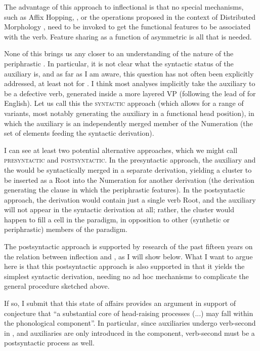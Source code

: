 \documentclass[output=paper]{LSP/langsci}
\begin{document}
The advantage of this approach to inflectional  is that no special mechanisms, such as Affix Hopping, , or the operations proposed in the context of Distributed Morphology \citep{HalleMarantz1993,Embick2000}, need to be invoked to get the functional features to be associated with the verb. Feature sharing \citep{Koster1987} as a function of asymmetric  \citep{Zwart2005} is all that is needed.

None of this brings us any closer to an understanding of the nature of the periphrastic . In particular, it is not clear what the syntactic status of the auxiliary is, and as far as I am aware, this question has not often been explicitly addressed, at least not for . I think most analyses implicitly take the auxiliary to be a defective verb, generated inside a more layered VP (following the lead of \citealt[20]{AkmajianEtAl1979} for English). Let us call this the \textsc{syntactic} approach (which allows for a range of variants, most notably generating the auxiliary in a functional head position), in which the auxiliary is an independently merged member of the Numeration (the set of elements feeding the syntactic derivation).

I can see at least two potential alternative approaches, which we might call \textsc{presyntactic} and \textsc{postsyntactic}. In the presyntactic approach, the auxiliary and the  would be syntactically merged in a separate derivation, yielding a cluster to be inserted as a Root into the Numeration for another derivation (the derivation generating the clause in which the periphrastic  features). In the postsyntactic approach, the derivation would contain just a single verb Root, and the auxiliary will not appear in the syntactic derivation at all; rather, the cluster would happen to fill a cell in the  paradigm, in opposition to other (synthetic or periphrastic) members of the paradigm.

The postsyntactic approach is supported by research of the past fifteen years on the relation between inflection and , as I will show below. What I want to argue here is that this postsyntactic approach is also supported in that it yields the simplest syntactic derivation, needing no ad hoc mechanisms to complicate the general  procedure sketched above.

If so, I submit that this state of affairs provides an argument in support of  conjecture that “a substantial core of head-raising processes (...) may fall within the phonological component”. In particular, since auxiliaries undergo verb-second in , and auxiliaries are only introduced in the  component, verb-second must be a postsyntactic process as well.
\end{document}
